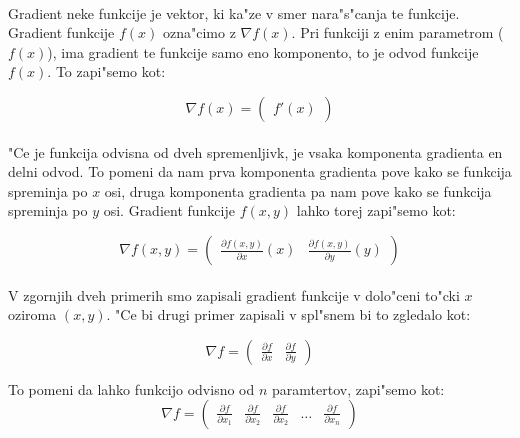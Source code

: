 \paragraph{}
Gradient neke funkcije je vektor, ki ka"ze v smer nara"s"canja te funkcije. Gradient funkcije $f(x)$ ozna"cimo z $\nabla f(x)$. Pri funkciji z enim parametrom ($f(x)$), ima gradient te funkcije samo eno komponento, to je odvod funkcije $f(x)$. To zapi"semo kot:

\[\nabla f(x) = \begin{pmatrix}f'(x)\end{pmatrix} \]

\paragraph{}
"Ce je funkcija odvisna od dveh spremenljivk, je vsaka komponenta gradienta en delni odvod. To pomeni da nam prva komponenta gradienta pove kako se funkcija spreminja po $x$ osi, druga komponenta gradienta pa nam pove kako se funkcija spreminja po $y$ osi. Gradient funkcije $f(x,y)$ lahko torej zapi"semo kot:

\[\nabla f(x,y) = \begin{pmatrix}
\frac{\partial f(x,y)}{\partial x} (x) &
\frac{\partial f(x,y)}{\partial y} (y)
\end{pmatrix} \]

\paragraph{}
V zgornjih dveh primerih smo zapisali gradient funkcije v dolo"ceni to"cki $x$ oziroma $(x, y)$. "Ce bi drugi primer zapisali v spl"snem bi to zgledalo kot:

\[\nabla f = \begin{pmatrix}
\frac{\partial f}{\partial x} &
\frac{\partial f}{\partial y}
\end{pmatrix}
\]

To pomeni da lahko funkcijo odvisno od $n$ paramtertov, zapi"semo kot:
\[\nabla f = \begin{pmatrix}
\frac{\partial f}{\partial x_1} &
\frac{\partial f}{\partial x_2} &
\frac{\partial f}{\partial x_2} &
\dots &
\frac{\partial f}{\partial x_n}
\end{pmatrix} \]